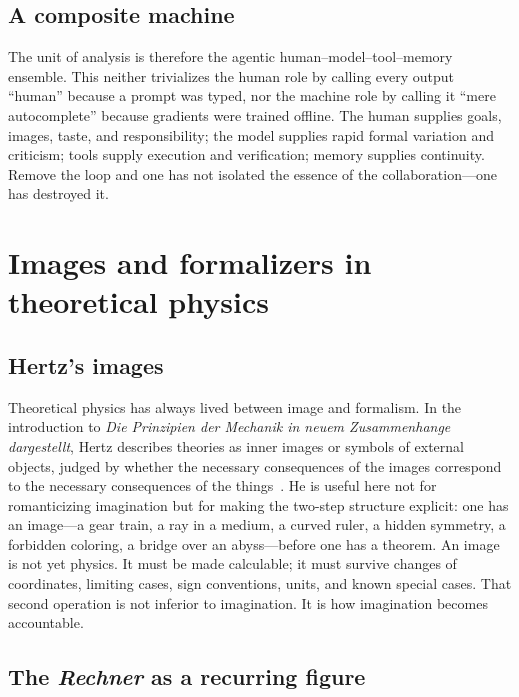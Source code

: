 \documentclass[
  aps,
  reprint,
  superscriptaddress,
  floatfix,
  nofootinbib,
  longbibliography
]{revtex4-2}
\begin{document}
\subsection{A composite machine}

The unit of analysis is therefore the agentic human--model--tool--memory ensemble. This
neither trivializes the human role by calling every output ``human'' because a
prompt was typed, nor the machine role by calling it ``mere autocomplete''
because gradients were trained offline. The human supplies goals, images, taste,
and responsibility; the model supplies rapid formal variation and criticism;
tools supply execution and verification; memory supplies continuity. Remove the
loop and one has not isolated the essence of the collaboration---one has
destroyed it.

\section{Images and formalizers in theoretical physics}
\label{sec:history}

\subsection{Hertz's images}

Theoretical physics has always lived between image and formalism. In the
introduction to \emph{Die Prinzipien der Mechanik in neuem Zusammenhange
dargestellt}, Hertz describes theories as inner images or symbols of external
objects, judged by whether the necessary consequences of the images correspond to
the necessary consequences of the things~\cite{hertz-94,lutzen2005}. He is useful
here not for romanticizing imagination but for making the two-step structure
explicit: one has an image---a gear train, a ray in a medium, a curved ruler, a
hidden symmetry, a forbidden coloring, a bridge over an abyss---before one has a
theorem. An image is not yet physics. It must be made calculable; it must survive
changes of coordinates, limiting cases, sign conventions, units, and known
special cases. That second operation is not inferior to imagination. It is how
imagination becomes accountable.

\subsection{The \emph{Rechner} as a recurring figure}
\end{document}
